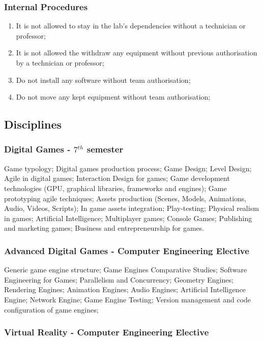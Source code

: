\subsubsection{Internal Procedures}
\begin{enumerate}
    \item It is not allowed to stay in the lab's dependencies without a technician or professor;
    \item It is not allowed the withdraw any equipment without previous authorisation by a technician or professor; 
    \item Do not install any software without team authorisation;
    \item Do not move any kept equipment without team authorisation;
\end{enumerate}

\newpage
\subsection{Disciplines}

\subsubsection{Digital Games - $7^{th}$ semester} 

Game typology; Digital games production process; Game Design; Level Design; Agile in digital games; Interaction Design for games; Game development technologies (GPU, graphical libraries, frameworks and engines); Game prototyping agile techniques; Assets production (Scenes, Models, Animations, Audio, Videos, Scripts); In game assets integration; Play-testing; Physical realism in games; Artificial Intelligence; Multiplayer games; Console Games; Publishing and marketing games; Business and entrepreneurship 
for games.

\subsubsection{Advanced Digital Games - Computer Engineering Elective}

Generic game engine structure; Game Engines Comparative Studies; Software Engineering for Games; Parallelism and Concurrency; Geometry Engines; Rendering Engines; Animation Engines; Audio Engines; Artificial Intelligence Engine; Network Engine; Game Engine Testing; Version management and code configuration of game engines;

\subsubsection{Virtual Reality - Computer Engineering Elective}

